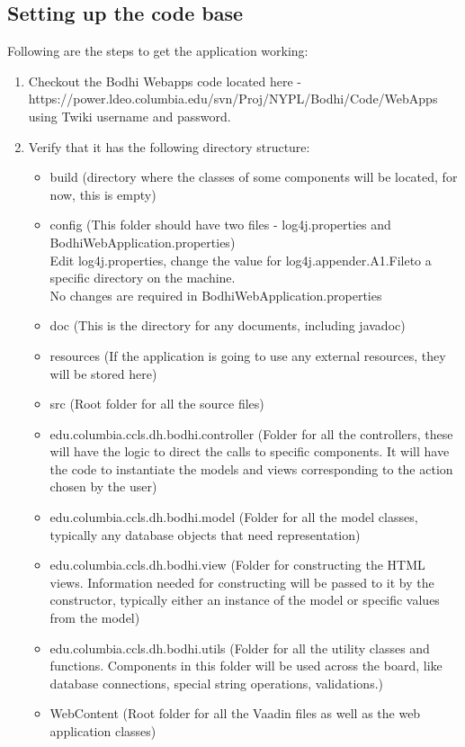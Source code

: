 \documentclass[12pt]{article}
\begin{document}
\subsection{Setting up the code base}
Following are the steps to get the application working:
\begin{enumerate}
\item Checkout the Bodhi Webapps code located here -\\ https://power.ldeo.columbia.edu/svn/Proj/NYPL/Bodhi/Code/WebApps using Twiki username and password.

\item Verify that it has the following directory structure:
\begin{itemize}
    \item build (directory where the classes of some components will be located, for now, this is empty)
\item config (This folder should have two files - log4j.properties and BodhiWebApplication.properties)\\
Edit log4j.properties, change the value for \textgravedbl log4j.appender.A1.File\textasciidieresis to a specific directory on the machine.\\
No changes are required in BodhiWebApplication.properties
\item doc (This is the directory for any documents, including javadoc)
\item resources (If the application is going to use any external resources, they will be stored here)
\item src (Root folder for all the source files)
\item edu.columbia.ccls.dh.bodhi.controller (Folder for all the controllers, these will have the logic to direct the calls to specific components. It will have the code to instantiate the models and views corresponding to the action chosen by the user)
\item edu.columbia.ccls.dh.bodhi.model (Folder for all the model classes, typically any database objects that need representation)
\item edu.columbia.ccls.dh.bodhi.view (Folder for constructing the HTML views. Information needed for constructing will be passed to it by the constructor, typically either an instance of the model or specific values from the model)
\item edu.columbia.ccls.dh.bodhi.utils (Folder for all the utility classes and functions. Components in this folder will be used across the board, like database connections, special string operations, validations.)
\item WebContent (Root folder for all the Vaadin files as well as the web application classes)
\end{itemize}


\end{enumerate}
\end{document}
